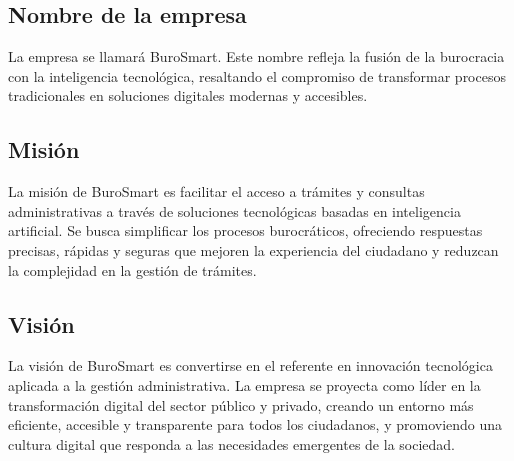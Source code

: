 \subsection{Nombre de la empresa}
La empresa se llamará BuroSmart. Este nombre refleja la fusión de la burocracia con la inteligencia tecnológica, resaltando el compromiso de transformar procesos tradicionales en soluciones digitales modernas y accesibles.

\subsection{Misión}
La misión de BuroSmart es facilitar el acceso a trámites y consultas administrativas a través de soluciones tecnológicas basadas en inteligencia artificial. Se busca simplificar los procesos burocráticos, ofreciendo respuestas precisas, rápidas y seguras que mejoren la experiencia del ciudadano y reduzcan la complejidad en la gestión de trámites.

\subsection{Visión}
La visión de BuroSmart es convertirse en el referente en innovación tecnológica aplicada a la gestión administrativa. La empresa se proyecta como líder en la transformación digital del sector público y privado, creando un entorno más eficiente, accesible y transparente para todos los ciudadanos, y promoviendo una cultura digital que responda a las necesidades emergentes de la sociedad.




